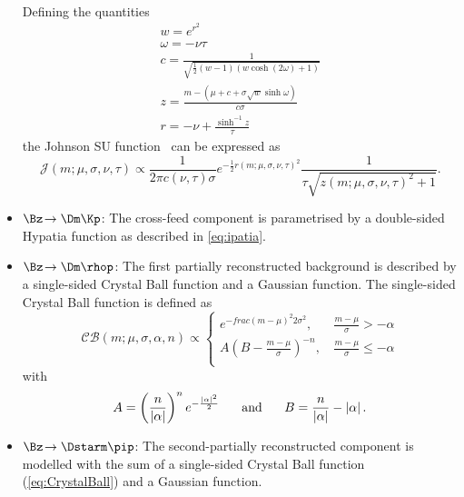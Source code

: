 \begin{itemize}
\begin{equation}
\begin{aligned}
	\end{aligned}
	\end{equation}
	Defining the quantities
	\begin{align*}
	&w=e^{r^2}&\\
	&\omega=-\nu\tau&\\
	&c=\frac{1}{\sqrt{\frac{1}{2}\left(w-1\right)\left(w\cosh\!\left(2\omega\right)+1\right)}}&\\
	&z=\frac{m-\left(\mu+c+\sigma\sqrt{w}\sinh\omega\right)}{c\sigma}&\\
	&r=-\nu+\frac{\sinh^{-1}z}{\tau}&
	\end{align*}
	the Johnson SU function~\cite{JohnsonSU} can be expressed as
	\begin{equation}
	\mathcal{J}\!\left(m;\mu,\sigma,\nu,\tau\right)\propto\frac{1}{2\pi c(\nu,\tau)\sigma}e^{-\frac{1}{2}r(m;\mu,\sigma,\nu,\tau)^2}\frac{1}{\tau\sqrt{z(m;\mu,\sigma,\nu,\tau)^2+1}}.\label{eq:johnsonsu}
	\end{equation}
	\item $\Bz\!\to\Dm\Kp$: The cross-feed component is parametrised by a double-sided Hypatia function as described in \cref{eq:ipatia}.
	\item $\Bz\!\to\Dm\rhop$: The first partially reconstructed background is described by a single-sided Crystal Ball function and a Gaussian function.
	The single-sided Crystal Ball function is defined as
	\begin{equation}
	\mathcal{C\!B}\!\left(m;\mu,\sigma,\alpha,n\right)\propto\begin{cases}
	e^{-frac{(m-\mu)^2}{2\sigma^2}}, &\, \frac{m-\mu}{\sigma}>-\alpha\\
	A\left(B-\frac{m-\mu}{\sigma}\right)^{-n}, &\, \frac{m-\mu}{\sigma}\leq-\alpha\\\end{cases}\label{eq:CrystalBall}
	\end{equation}
	with
	\begin{equation}
	A=\left(\frac{n}{\left|\alpha\right|}\right)^{n}e^{-\frac{\left|\alpha\right|^2}{2}}\hspace{0.5cm}\text{ and }\hspace{0.5cm}B=\frac{n}{\left|\alpha\right|}-\left|\alpha\right|.
	\end{equation}
	\item $\Bz\!\to\Dstarm\pip$: The second-partially reconstructed component is modelled with the sum of a single-sided Crystal Ball function (\cref{eq:CrystalBall}) and a Gaussian function.
\end{itemize}
